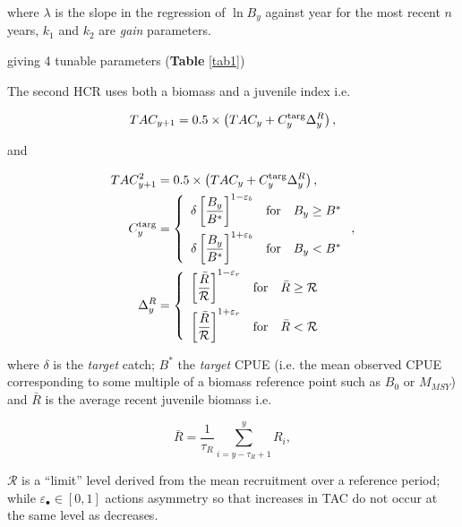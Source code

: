 \documentclass[a4paper, 10pt]{article}
\newcommand{\ds}{\displaystyle}
\newcommand{\veps}{\varepsilon}
\begin{document}
 where $\lambda$ is the slope in the regression of $\ln B_y$ against year for the most recent $n$ years,  
 $k_1$ and $k_2$ are \textit{gain} parameters.

giving 4 tunable parameters (\textbf{Table} \ref{tab1})


The second HCR uses both a biomass and a juvenile index i.e.

\begin{equation} 
 \begin{align*}
 \ds TAC_{y+1} &= 0.5\times\left(TAC_y+C^{\rm targ}_y\Delta^R_y\right),\\
 \end{align*}
  \end{equation}

and

 \begin{equation}
       \begin{align*}
            \ds TAC^2_{y+1} &= 0.5\times\left(TAC_y+C^{\rm targ}_y\Delta^R_y\right),\\
                \ds C^{\rm targ}_y &= \left\{\begin{array}{rcl}\ds{\delta \left[\frac{B_{y}}{B^*}\right]^{1-\veps_b}} & \mbox{for} & B_{y}\geq B^*\\[0.35cm]
\ds{\delta \left[\frac{B_{y}}{B^*}\right]^{1+\veps_b}} & \mbox{for} & B_{y}<B^*
    \end{array}\right.,\\
\ds \Delta^R_y &= \left\{\begin{array}{rcl}\ds{\left[\frac{\bar{R}}{\mathcal{R}}\right]^{1-\veps_r}} & \mbox{for} & \bar{R}\geq\mathcal{R}\\[0.35cm]
\ds{\left[\frac{\bar{R}}{\mathcal{R}}\right]^{1+\veps_r}} & \mbox{for} & \bar{R}<\mathcal{R}
\end{array}\right.
        \end{align*}
  \end{equation}

 where $\delta$ is the \textit{target} catch; $B^*$ the \textit{target} CPUE (i.e. the mean observed CPUE corresponding to some 
 multiple of a biomass reference point such as $B_0$ or $M_{MSY}$) and 
$\bar{R}$ is the average recent juvenile biomass i.e.

\begin{equation}
 \ds \bar{R}=\frac{1}{\tau_R}\sum\limits_{i=y-\tau_R+1}^{y}R_i,
 \end{equation}

 
$\mathcal{R}$ is a ``limit'' level derived from the mean recruitment over a reference period; \\
while $\veps_\bullet\in[0,1]$ actions asymmetry so that increases in TAC do not occur at the same level as decreases.
\end{document}
